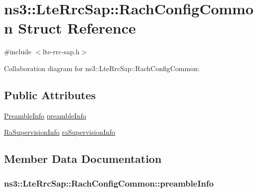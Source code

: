 \hypertarget{structns3_1_1LteRrcSap_1_1RachConfigCommon}{}\section{ns3\+:\+:Lte\+Rrc\+Sap\+:\+:Rach\+Config\+Common Struct Reference}
\label{structns3_1_1LteRrcSap_1_1RachConfigCommon}


{\ttfamily \#include $<$lte-\/rrc-\/sap.\+h$>$}



Collaboration diagram for ns3\+:\+:Lte\+Rrc\+Sap\+:\+:Rach\+Config\+Common\+:
\subsection*{Public Attributes}
\begin{DoxyCompactItemize}
\item 
\hyperlink{structns3_1_1LteRrcSap_1_1PreambleInfo}{Preamble\+Info} \hyperlink{structns3_1_1LteRrcSap_1_1RachConfigCommon_a77c5e39f6816940c126b73d6634c1038}{preamble\+Info}
\item 
\hyperlink{structns3_1_1LteRrcSap_1_1RaSupervisionInfo}{Ra\+Supervision\+Info} \hyperlink{structns3_1_1LteRrcSap_1_1RachConfigCommon_ab62e223ba80f1d2d4618481ee04e07cd}{ra\+Supervision\+Info}
\end{DoxyCompactItemize}


\subsection{Member Data Documentation}
\subsubsection[{\texorpdfstring{preamble\+Info}{preambleInfo}}]{ ns3\+::\+Lte\+Rrc\+Sap\+::\+Rach\+Config\+Common\+::preamble\+Info}\hypertarget{structns3_1_1LteRrcSap_1_1RachConfigCommon_a77c5e39f6816940c126b73d6634c1038}{}\label{structns3_1_1LteRrcSap_1_1RachConfigCommon_a77c5e39f6816940c126b73d6634c1038}
